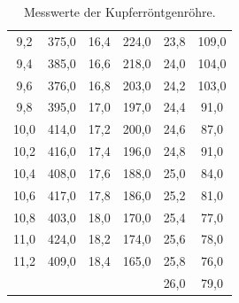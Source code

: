 \begin{table}
\begin{tabular}{c c | c c | c c}
     9,2 & 375,0 & 16,4 & 224,0 & 23,8 &  109,0 \\
     9,4 & 385,0 & 16,6 & 218,0 & 24,0 &  104,0 \\
     9,6 & 376,0 & 16,8 & 203,0 & 24,2 &  103,0 \\
     9,8 & 395,0 & 17,0 & 197,0 & 24,4 &   91,0 \\
    10,0 & 414,0 & 17,2 & 200,0 & 24,6 &   87,0 \\
    10,2 & 416,0 & 17,4 & 196,0 & 24,8 &   91,0 \\
    10,4 & 408,0 & 17,6 & 188,0 & 25,0 &   84,0 \\
    10,6 & 417,0 & 17,8 & 186,0 & 25,2 &   81,0 \\
    10,8 & 403,0 & 18,0 & 170,0 & 25,4 &   77,0 \\
    11,0 & 424,0 & 18,2 & 174,0 & 25,6 &   78,0 \\
    11,2 & 409,0 & 18,4 & 165,0 & 25,8 &   76,0 \\
         &       &      &       & 26,0 &   79,0 \\
    \bottomrule
  \end{tabular}
  \caption{Messwerte der Kupferröntgenröhre.}
  \label{tab:Cu}
\end{table}

